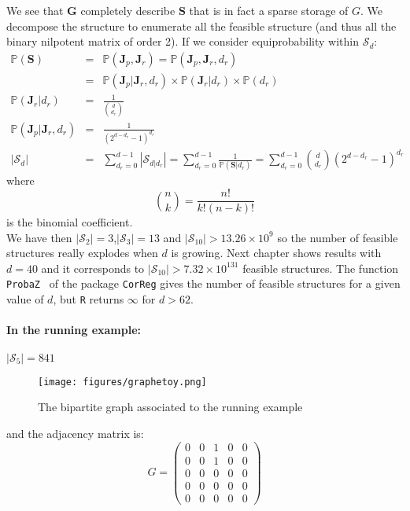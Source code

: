 \documentclass[12pt,a4paper]{report}
\begin{document}
	We see that $\boldsymbol{G}$ completely describe $\boldsymbol{S}$ that is in fact a sparse storage of $G$.
	We decompose the structure to enumerate all the feasible structure (and thus all the binary nilpotent matrix of order 2).
	 If we consider equiprobability within $\mathcal{S}_d$:
	\begin{eqnarray}
		\mathbb{P}(\boldsymbol{S})&=& \mathbb{P}(\boldsymbol{J}_p,\boldsymbol{J}_r)=\mathbb{P}(\boldsymbol{J}_p,\boldsymbol{J}_r,d_r) \\
		&=& \mathbb{P}(\boldsymbol{J}_p|\boldsymbol{J}_r,d_r) \times  \mathbb{P}(\boldsymbol{J}_r|d_r)\times \mathbb{P}(d_r) \\
		 \mathbb{P}(\boldsymbol{J}_r|d_r)&=& \frac{1}{{d \choose d_r}} \\
		\mathbb{P}(\boldsymbol{J}_p|\boldsymbol{J}_r,d_r)&=& \frac{1}{(2^{d-d_r}-1)^{d_r}}\\
		|\mathcal{S}_d|&=&\sum_{d_r=0}^{d-1}|\mathcal{S}_{d|d_r}|= \sum_{d_r=0}^{d-1}\frac{1}{\mathbb{P}(\boldsymbol{S}|d_r)} =\sum_{d_r=0}^{d-1}{d \choose d_r}(2^{d-d_r}-1)^{d_r}
	\end{eqnarray}
	where \begin{equation}
	{n \choose k}=\frac{n!}{k!(n-k)!}
	\end{equation} is the binomial coefficient.\\
	We have then $|\mathcal{S}_2| =3 $,$|\mathcal{S}_3| =13 $ and $|\mathcal{S}_{10}| >13.26\times10^9 $ so the number of feasible structures really explodes when $d$ is growing. Next chapter shows results with $d=40$ and it corresponds to $|\mathcal{S}_{10}| >7.32\times10^{131} $ feasible structures. The function {\tt ProbaZ } of the package { \tt CorReg} gives the number of feasible structures for a given value of $d$, but {\tt R} returns $\infty$ for $d>62$.

\paragraph{In the running example:} $|\mathcal{S}_5| =841 $

\begin{figure}[h!]
	\centering
	\texttt{[image: figures/graphetoy.png]} 
	\caption{The bipartite graph associated to the running example}
	\end{figure}	
and the adjacency matrix is:
\begin{displaymath}G=\left(	\begin{array}{ccccc}
	0 & 0 & 1 & 0 & 0 \\ 
	0 & 0 & 1 & 0 & 0 \\ 
	0 & 0 & 0 & 0 & 0 \\ 
	0 & 0 & 0 & 0 & 0 \\ 
	0 & 0 & 0 & 0 & 0
	\end{array} \right)
\end{displaymath}
\end{document}
